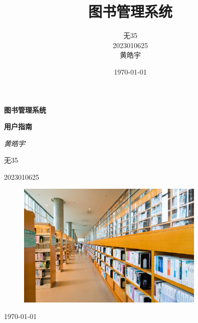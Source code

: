 \documentclass[12pt,twoside]{ctexart}
\title{\Huge{\textbf{\fangsong 图书管理系统}}}
\author{\songti 无35 \\ 2023010625 \\ 黄皓宇}
\date{\today}
\begin{document}
\begin{titlepage}

    \centering %

    \vspace*{2cm} %

    {\Huge\textbf{\heiti 图书管理系统}\par} %

    \vspace{0.5cm} %

    {\large\textbf{用户指南}\par} %

    \vspace{1.5cm} %

    {\Large\textit{黄皓宇}\par} %

    \vspace{0.5cm} %

    {\large 无35\par} %

    \vspace{0.5cm} %

    {\large 2023010625\par} %

    \vspace{0.5cm} %

    \begin{figure}[H]
        \centering
        \includegraphics[width=0.8\textwidth]{System.jpg}
    \end{figure}



    {\large \today\par} %

    \restoregeometry %
\end{titlepage}
\end{document}
